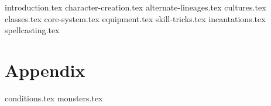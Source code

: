 \documentclass[10pt,twoside,twocolumn,openany]{dndbook}
\begin{document}
{introduction.tex}
{character-creation.tex}
{alternate-lineages.tex}
{cultures.tex}
{classes.tex}
{core-system.tex}
{equipment.tex}
{skill-tricks.tex}
{incantations.tex}
{spellcasting.tex}
\chapter{Appendix}\label{ch:appendix}
{conditions.tex}
{monsters.tex}
\end{document}
